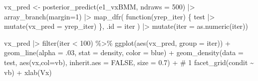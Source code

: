 \documentclass[
  letterpaper,
  DIV=11,
  numbers=noendperiod]{scrartcl}
\newenvironment{Shaded}{\begin{snugshade}}{\end{snugshade}}
\newcommand{\AttributeTok}[1]{\textcolor[rgb]{0.40,0.45,0.13}{#1}}
\newcommand{\CommentTok}[1]{\textcolor[rgb]{0.37,0.37,0.37}{#1}}
\newcommand{\ConstantTok}[1]{\textcolor[rgb]{0.56,0.35,0.01}{#1}}
\newcommand{\ControlFlowTok}[1]{\textcolor[rgb]{0.00,0.23,0.31}{#1}}
\newcommand{\DecValTok}[1]{\textcolor[rgb]{0.68,0.00,0.00}{#1}}
\newcommand{\FloatTok}[1]{\textcolor[rgb]{0.68,0.00,0.00}{#1}}
\newcommand{\FunctionTok}[1]{\textcolor[rgb]{0.28,0.35,0.67}{#1}}
\newcommand{\NormalTok}[1]{\textcolor[rgb]{0.00,0.23,0.31}{#1}}
\newcommand{\OtherTok}[1]{\textcolor[rgb]{0.00,0.23,0.31}{#1}}
\newcommand{\SpecialCharTok}[1]{\textcolor[rgb]{0.37,0.37,0.37}{#1}}
\newcommand{\StringTok}[1]{\textcolor[rgb]{0.13,0.47,0.30}{#1}}
\begin{document}
\begin{Shaded}
\begin{Highlighting}[]
\NormalTok{vx\_pred }\OtherTok{\textless{}{-}} 
  \FunctionTok{posterior\_predict}\NormalTok{(e1\_vxBMM, }\AttributeTok{ndraws =} \DecValTok{500}\NormalTok{) }\SpecialCharTok{|\textgreater{}} 
  \FunctionTok{array\_branch}\NormalTok{(}\AttributeTok{margin=}\DecValTok{1}\NormalTok{) }\SpecialCharTok{|\textgreater{}} 
   \FunctionTok{map\_dfr}\NormalTok{( }
    \ControlFlowTok{function}\NormalTok{(yrep\_iter) \{}
\NormalTok{      test  }\SpecialCharTok{|\textgreater{}}
        \FunctionTok{mutate}\NormalTok{(}\AttributeTok{vx\_pred =}\NormalTok{ yrep\_iter)}
\NormalTok{    \},}
    \AttributeTok{.id =} \StringTok{\textquotesingle{}iter\textquotesingle{}}
\NormalTok{  ) }\SpecialCharTok{|\textgreater{}}
  \FunctionTok{mutate}\NormalTok{(}\AttributeTok{iter =} \FunctionTok{as.numeric}\NormalTok{(iter))}



\NormalTok{vx\_pred  }\SpecialCharTok{|\textgreater{}}
  \FunctionTok{filter}\NormalTok{(iter }\SpecialCharTok{\textless{}} \DecValTok{100}\NormalTok{) }\SpecialCharTok{\%\textgreater{}\%}
  \FunctionTok{ggplot}\NormalTok{(}\FunctionTok{aes}\NormalTok{(vx\_pred, }\AttributeTok{group =}\NormalTok{ iter)) }\SpecialCharTok{+}
  \FunctionTok{geom\_line}\NormalTok{(}\AttributeTok{alpha =}\NormalTok{ .}\DecValTok{03}\NormalTok{, }\AttributeTok{stat =} \StringTok{\textquotesingle{}density\textquotesingle{}}\NormalTok{, }\AttributeTok{color =} \StringTok{\textquotesingle{}blue\textquotesingle{}}\NormalTok{) }\SpecialCharTok{+}
  \FunctionTok{geom\_density}\NormalTok{(}\AttributeTok{data =}\NormalTok{ test,}
               \FunctionTok{aes}\NormalTok{(vx,}\AttributeTok{col=}\NormalTok{vb),}
               \AttributeTok{inherit.aes =} \ConstantTok{FALSE}\NormalTok{,}
               \AttributeTok{size =} \FloatTok{0.7}\NormalTok{) }\SpecialCharTok{+} \CommentTok{\# 1}
  \FunctionTok{facet\_grid}\NormalTok{(condit }\SpecialCharTok{\textasciitilde{}}\NormalTok{ vb) }\SpecialCharTok{+}
  \FunctionTok{xlab}\NormalTok{(}\StringTok{\textquotesingle{}Vx\textquotesingle{}}\NormalTok{)}
\end{Highlighting}
\end{Shaded}
\end{document}
